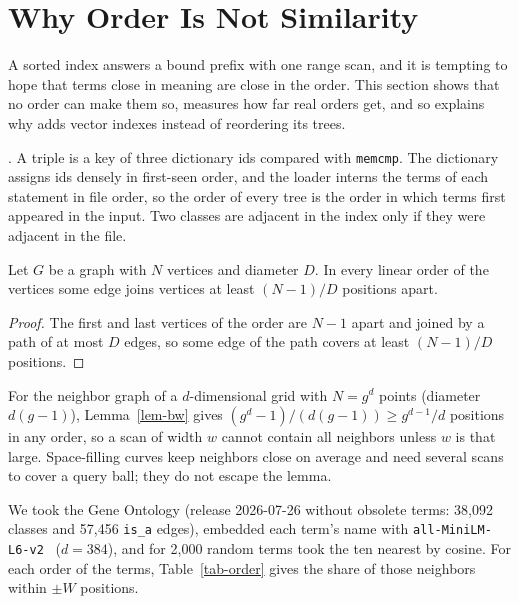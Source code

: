 \section{Why Order Is Not Similarity}
\label{sec-order}

A sorted index answers a bound prefix with one range scan, and it is tempting
to hope that terms close in meaning are close in the order.
This section shows that no order can make them so, measures how far real
orders get, and so explains why \sys adds vector indexes instead of reordering
its trees.

.
A triple is a key of three dictionary ids compared with \texttt{memcmp}.
The dictionary assigns ids densely in first-seen order, and the loader interns
the terms of each statement in file order, so the order of every tree is the
order in which terms first appeared in the input.
Two classes are adjacent in the index only if they were adjacent in the file.

\begin{lemma}[Bandwidth]\label{lem-bw}
Let $G$ be a graph with $N$ vertices and diameter $D$.
In every linear order of the vertices some edge joins vertices at least
$(N-1)/D$ positions apart.
\end{lemma}
\begin{proof}
The first and last vertices of the order are $N-1$ apart and joined by a path
of at most $D$ edges, so some edge of the path covers at least $(N-1)/D$
positions.
\end{proof}

For the neighbor graph of a $d$-dimensional grid with $N=g^d$ points
(diameter $d(g-1)$), Lemma~\ref{lem-bw} gives $(g^d-1)/(d(g-1)) \ge g^{d-1}/d$
positions in any order, so a scan of width $w$ cannot contain all neighbors
unless $w$ is that large.
Space-filling curves keep neighbors close on average and need several scans to
cover a query ball; they do not escape the lemma.

We took the Gene Ontology (release 2026-07-26 without obsolete terms: 38,092
classes and 57,456 \texttt{is\_a} edges), embedded each term's name with
\texttt{all-MiniLM-L6-v2}~\cite{reimers2019} ($d=384$), and for 2,000 random
terms took the ten nearest by cosine.
For each order of the terms, Table~\ref{tab-order} gives the share of those
neighbors within $\pm W$ positions.

